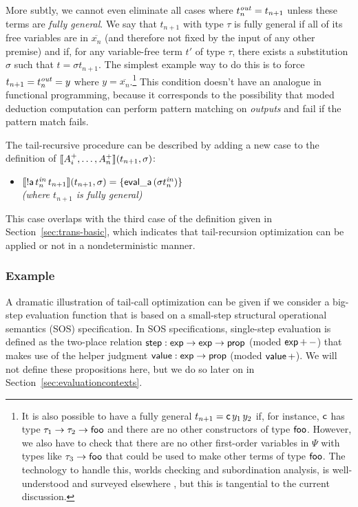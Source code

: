 More subtly, we cannot even eliminate all cases where $t^{\it out}_n =
t_{n+1}$ unless these terms are {\it fully general}. We say that
$t_{n+1}$ with type $\tau$ is fully general if all of its free
variables are in $\overline{x_n}$ (and therefore not fixed by the
input of any other premise) and if, for any variable-free term $t'$ of
type $\tau$, there exists a substitution $\sigma$ such that $t =
{\sigma}t_{n+1}$. The simplest example way to do this is to force
$t_{n+1} = t^{\it out}_n = y$ where $y = \overline{x_n}$.\footnote{It
  is also possible to have a fully general $t_{n+1} = {\sf
    c}\,y_1\,y_2$ if, for instance, ${\sf c}$ has type $\tau_1
  \rightarrow \tau_2 \rightarrow {\sf foo}$ and there are no other
  constructors of type ${\sf foo}$. However, we also have to check
  that there are no other first-order variables in $\Psi$ with types
  like $\tau_3 \rightarrow {\sf foo}$ that could be used to make other
  terms of type ${\sf foo}$. The technology to handle this, worlds
  checking and subordination analysis, is well-understood and surveyed
  elsewhere \cite{harper07mechanizing}, but this is tangential to the
  current discussion.} This condition doesn't have an analogue in
functional programming, because it corresponds to the possibility that
moded deduction computation can perform pattern matching on {\it
  outputs} and fail if the pattern match fails.

The tail-recursive procedure can be described by adding a new 
case to the definition of 
$\llbracket {A^+_i,\ldots,A^+_n} \rrbracket({t_{n+1}},{\sigma})$:

\begin{itemize}
\item $\llbracket {{!}{\sf a}\,t^{\it in}_n\,t_{n+1}} \rrbracket({t_{n+1}},{\sigma}) 
  = \{{\sf eval\_a}\,({\sigma}{t^{\it in}_n})\}$
\\
  {\it (where $t_{n+1}$ is fully general)}
\end{itemize}
This case overlaps with the third case of the definition given
in Section~\ref{sec:trans-basic}, which indicates that tail-recursion
optimization can be applied or not in a nondeterministic manner.

\subsubsection{Example}

A dramatic illustration of tail-call optimization can be given if we
consider a big-step evaluation function that is based on a small-step
structural operational semantics (SOS) specification. In SOS
specifications, single-step evaluation is defined as the two-place
relation ${\sf step} : {\sf exp} \rightarrow {\sf exp} \rightarrow
{\sf prop}$ (moded ${\sf exp}\,{+}\,{-}$) that makes use of the helper
judgment ${\sf value} : {\sf exp} \rightarrow {\sf prop}$ (moded ${\sf
  value}\,{+}$). We will not define these propositions here, but we do
so later on in Section~\ref{sec:evaluationcontexts}.

